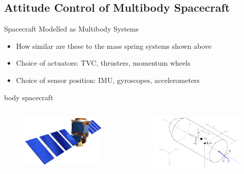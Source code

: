 \documentclass{beamer}
\begin{document}
\subsection{Attitude Control of Multibody Spacecraft}
\begin{frame}{Spacecraft Modelled as Multibody Systems}
\begin{itemize}
\item How similar are these to the mass spring systems shown above
\item Choice of actuators: TVC, thrusters, momentum wheels
\item Choice of sensor position: IMU, gyroscopes, accelerometers
\end{itemize}body spacecraft
\begin{columns}
\begin{figure}
\includegraphics[width=\textwidth]{images/satellite.jpg}
\end{figure}
\begin{figure}
\includegraphics[width=\textwidth]{images/rocket3.pdf}
\end{figure}
\end{columns}
\end{frame}
\end{document}
